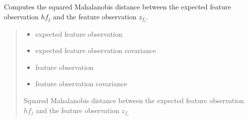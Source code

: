 \documentclass[letterpaper,10pt,english]{sphinxmanual}
\begin{document}
\begin{fulllineitems}
\begin{fulllineitems}
\label{\detokenize{FEKFMBLocalization:FEKFMBL.FEKFMBL.SquaredMahalanobisDistance}}
\pysigstartsignatures
{}
\pysigstopsignatures
\sphinxAtStartPar
Computes the squared Mahalanobis distance between the expected feature observation \(hf_j\) and the feature observation \(z_{f_i}\).
\begin{quote}\begin{description}
\begin{itemize}
\item {} 
\sphinxAtStartPar
{} \textendash{} expected feature observation

\item {} 
\sphinxAtStartPar
{} \textendash{} expected feature observation covariance

\item {} 
\sphinxAtStartPar
{} \textendash{} feature observation

\item {} 
\sphinxAtStartPar
{} \textendash{} feature observation covariance

\end{itemize}

\sphinxAtStartPar
Squared Mahalanobis distance between the expected feature observation \(hf_j\) and the feature observation \(z_{f_i}\)

\end{description}\end{quote}

\end{fulllineitems}



\end{fulllineitems}
\end{document}
